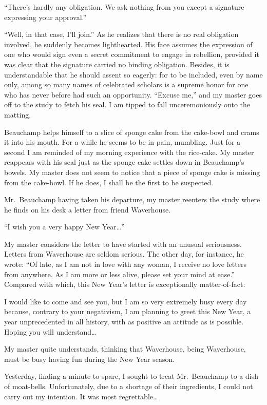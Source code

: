 \documentclass{book}
\begin{document}
``There's hardly any obligation. We ask nothing from you except a
signature expressing your approval.''

``Well, in that case, I'll join.'' As he realizes that there is no real
obligation involved, he suddenly becomes lighthearted. His face assumes
the expression of one who would sign even a secret commitment to engage
in rebellion, provided it was clear that the signature carried no
binding obligation. Besides, it is understandable that he should assent
so eagerly: for to be included, even by name only, among so many names
of celebrated scholars is a supreme honor for one who has never before
had such an opportunity. ``Excuse me,'' and my master goes off to the
study to fetch his seal. I am tipped to fall unceremoniously onto the
matting.

Beauchamp helps himself to a slice of sponge cake from the cake-bowl and
crams it into his mouth. For a while he seems to be in pain, mumbling.
Just for a second I am reminded of my morning experience with the
rice-cake. My master reappears with his seal just as the sponge cake
settles down in Beauchamp's bowels. My master does not seem to notice
that a piece of sponge cake is missing from the cake-bowl. If he does, I
shall be the first to be suspected.

Mr.~Beauchamp having taken his departure, my master reenters the study
where he finds on his desk a letter from friend Waverhouse.

``I wish you a very happy New Year\ldots{}''

My master considers the letter to have started with an unusual
seriousness. Letters from Waverhouse are seldom serious. The other day,
for instance, he wrote: ``Of late, as I am not in love with any woman, I
receive no love letters from anywhere. As I am more or less alive,
please set your mind at ease.'' Compared with which, this New Year's
letter is exceptionally matter-of-fact:

I would like to come and see you, but I am so very extremely busy every
day because, contrary to your negativism, I am planning to greet this
New Year, a year unprecedented in all history, with as positive an
attitude as is possible. Hoping you will understand\ldots{}

My master quite understands, thinking that Waverhouse, being Waverhouse,
must be busy having fun during the New Year season.

Yesterday, finding a minute to spare, I sought to treat Mr.~Beauchamp to
a dish of moat-bells. Unfortunately, due to a shortage of their
ingredients, I could not carry out my intention. It was most
regrettable\ldots{}
\end{document}
